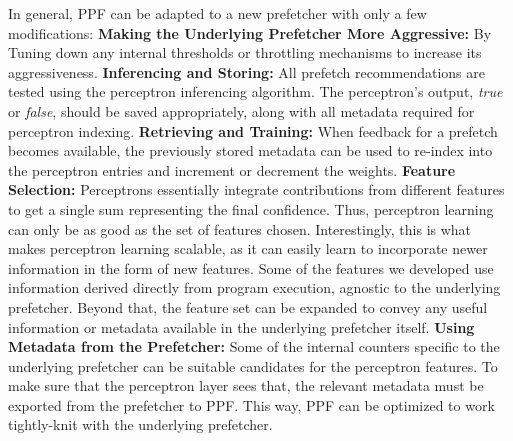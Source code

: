 \noindent In general, PPF can be adapted to a {new prefetcher} with only a
few modifications:
\newline
\newline
\noindent \textbf{Making the {Underlying} Prefetcher More Aggressive:} By Tuning 
down any internal thresholds or throttling mechanisms to increase its
aggressiveness.
\newline
\newline
\noindent \textbf{Inferencing and Storing:} All prefetch
recommendations are tested using the perceptron inferencing algorithm.
The perceptron's output, \textit{true} or \textit{false}, should be
saved appropriately, along with all metadata required for perceptron
indexing.
\newline
\newline
\noindent \textbf{Retrieving and Training:} When feedback for a
prefetch becomes available, the previously stored metadata can be used
to re-index into the perceptron entries and increment or decrement the
weights.
\newline
\newline
\noindent \textbf{Feature Selection:} Perceptrons essentially
integrate contributions from different features to get a single sum
representing the final confidence.  Thus, perceptron learning can only
be as good as the set of features chosen.  Interestingly, this is what
makes perceptron learning scalable, as it can easily learn to
incorporate newer information in the form of new features.  Some of
the features we developed use information derived directly from
program execution, agnostic to the {underlying} prefetcher.  Beyond that,
the feature set can be expanded to convey any useful information or
metadata available in the {underlying} prefetcher itself.
\newline
\newline
\noindent \textbf{Using Metadata from the Prefetcher:} Some of the 
internal counters specific to the underlying prefetcher can be suitable candidates
for the perceptron features. To make sure that the perceptron layer sees that, 
the relevant metadata must be exported from the prefetcher to PPF. This way,
PPF can be optimized to work tightly-knit with the {underlying} prefetcher.



